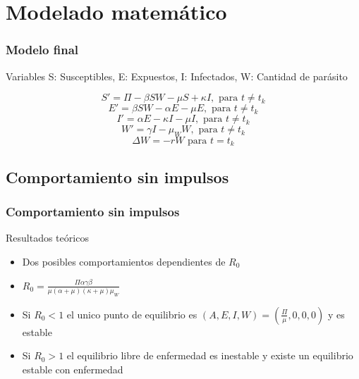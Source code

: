 \documentclass{beamer}
\begin{document}
\section{Modelado matemático}


\begin{frame}
  \frametitle{Modelo final}
  \begin{block}{Variables}
  	S: Susceptibles, E: Expuestos, I: Infectados, W: Cantidad de parásito
  \end{block}
  \begin{equation}
  S'=\Pi-\beta SW-\mu S+\kappa I, \text{ para }t\neq t_k
  \end{equation}
  \begin{equation}
  E'=\beta S W -\alpha E -\mu E, \text{ para }t\neq t_k
  \end{equation}
  \begin{equation}
  I'=\alpha E-\kappa I -\mu I, \text{ para }t\neq t_k
  \end{equation}
  \begin{equation}
  W'=\gamma I - \mu_W W,  \text{ para }t\neq t_k
  \end{equation}
  \begin{equation}
  \Delta W= -rW   \text{ para }t=t_k
  \end{equation}
\end{frame}




\subsection{Comportamiento sin impulsos}

\begin{frame}
	\frametitle{Comportamiento sin impulsos}
    \begin{block}{Resultados teóricos}
	  \begin{itemize}
		\item Dos posibles comportamientos dependientes de $R_0$
		\item $R_0= \frac{\Pi \alpha\gamma\beta}{\mu(\alpha+\mu)(\kappa+\mu)\mu_W}$
		\item Si $R_0<1$ el unico punto de equilibrio es $(A,E,I,W)=(\frac{\Pi}{\mu},0,0,0)$ y es estable
		\item Si $R_0>1$ el equilibrio libre de enfermedad es inestable  y existe un equilibrio estable con enfermedad
	  \end{itemize}	
	\end{block}
\end{frame}
\end{document}
